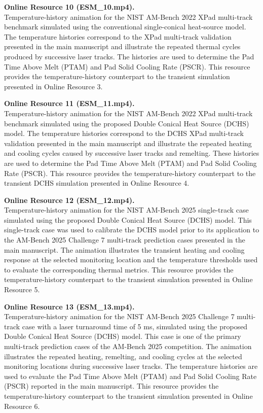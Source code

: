 \documentclass[11pt]{article}
\begin{document}
\medskip

\textbf{Online Resource 10 (ESM\_10.mp4).}\\
Temperature-history animation for the NIST AM-Bench 2022 XPad
multi-track benchmark simulated using the conventional single-conical
heat-source model. The temperature histories correspond to the XPad
multi-track validation presented in the main manuscript and illustrate
the repeated thermal cycles produced by successive laser tracks. The
histories are used to determine the Pad Time Above Melt (PTAM) and Pad
Solid Cooling Rate (PSCR). This resource provides the temperature-history
counterpart to the transient simulation presented in Online Resource 3.

\medskip

\textbf{Online Resource 11 (ESM\_11.mp4).}\\
Temperature-history animation for the NIST AM-Bench 2022 XPad
multi-track benchmark simulated using the proposed Double Conical
Heat Source (DCHS) model. The temperature histories correspond to
the DCHS XPad multi-track validation presented in the main manuscript
and illustrate the repeated heating and cooling cycles caused by
successive laser tracks and remelting. These histories are used to
determine the Pad Time Above Melt (PTAM) and Pad Solid Cooling Rate
(PSCR). This resource provides the temperature-history counterpart
to the transient DCHS simulation presented in Online Resource 4.

\medskip

\textbf{Online Resource 12 (ESM\_12.mp4).}\\
Temperature-history animation for the NIST AM-Bench 2025 single-track
case simulated using the proposed Double Conical Heat Source (DCHS)
model. This single-track case was used to calibrate the DCHS model
prior to its application to the AM-Bench 2025 Challenge 7 multi-track
prediction cases presented in the main manuscript. The animation
illustrates the transient heating and cooling response at the selected
monitoring location and the temperature thresholds used to evaluate
the corresponding thermal metrics. This resource provides the
temperature-history counterpart to the transient simulation presented
in Online Resource 5.

\medskip

\textbf{Online Resource 13 (ESM\_13.mp4).}\\
Temperature-history animation for the NIST AM-Bench 2025 Challenge 7
multi-track case with a laser turnaround time of 5 ms, simulated using
the proposed Double Conical Heat Source (DCHS) model. This case is one
of the primary multi-track prediction cases of the AM-Bench 2025
competition. The animation illustrates the repeated heating, remelting,
and cooling cycles at the selected monitoring locations during
successive laser tracks. The temperature histories are used to evaluate
the Pad Time Above Melt (PTAM) and Pad Solid Cooling Rate (PSCR)
reported in the main manuscript. This resource provides the
temperature-history counterpart to the transient simulation presented
in Online Resource 6.
\end{document}
